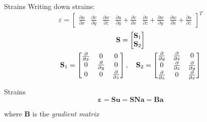 \documentclass[10pt]{beamer}
\newcommand{\BM}{\mathbf{B}}
\numberwithin{equation}{subsection}
\begin{document}
\begin{frame}{Strains}
    Writing down strains:
    \begin{equation}
        \varepsilon = \begin{bmatrix}
                        \frac{\partial u}{\partial x} &
                        \frac{\partial v}{\partial y} &
                        \frac{\partial w}{\partial z} &
                        \frac{\partial u}{\partial y} + \frac{\partial v}{\partial x} &
                        \frac{\partial v}{\partial z} + \frac{\partial w}{\partial y} &
                        \frac{\partial w}{\partial x} + \frac{\partial u}{\partial z} 
                    \end{bmatrix}^T
    \end{equation}
	\begin{gather}
		\mathbf{S} =  \begin{bmatrix}
			    	    \mathbf{S}_1 \\
				        \mathbf{S}_2
            	    \end{bmatrix} \notag \\
		\mathbf{S}_1 = \begin{bmatrix}
		                	\frac{\partial}{\partial x}	&	0				&	0	\\	
    						0	                        &  	\frac{\partial}{\partial y}	&	0	\\	
							0	    &	0				&	\frac{\partial}{\partial z}
					    \end{bmatrix} , \quad 
		\mathbf{S}_2 = \begin{bmatrix}
				            \frac{\partial}{\partial y}	&	\frac{\partial}{\partial x}	&	0	\\	
							0	&	\frac{\partial}{\partial z}	&	\frac{\partial}{\partial y}	\\	
				    \frac{\partial}{\partial z}	&	0				&	\frac{\partial}{\partial x}
					    \end{bmatrix} 
	\end{gather}
	\begin{alertblock}{Strains}
        \begin{equation} \label{eps}
	    		\mathbf{\varepsilon} = \mathbf{Su} = \mathbf{SNa} = \mathbf{Ba}
	    \end{equation}	
	\end{alertblock}
	where $\BM$ is the \emph{gradient matrix}
	
\end{frame}
\end{document}
